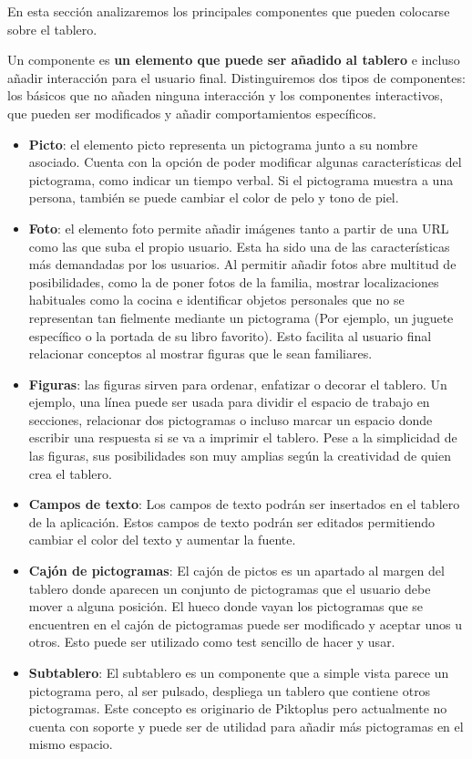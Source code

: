 En esta sección analizaremos los principales componentes que pueden colocarse sobre el tablero. 

Un componente es \textbf{un elemento que puede ser añadido al tablero} e incluso añadir interacción para el usuario final. Distinguiremos dos tipos de componentes: los básicos que no añaden ninguna interacción y los componentes interactivos, que pueden ser modificados y añadir comportamientos específicos.

\begin{itemize}
	
	
	\item \textbf{Picto}: el elemento picto representa un pictograma junto a su nombre asociado. Cuenta con la opción de poder modificar algunas características del pictograma, como indicar un tiempo verbal. Si el pictograma muestra a una persona, también se puede cambiar el color de pelo y tono de piel.
	
	\item \textbf{Foto}: el elemento foto permite añadir imágenes tanto a partir de una URL como las que suba el propio usuario. Esta ha sido una de las características más demandadas por los usuarios. Al permitir añadir fotos abre multitud de posibilidades, como la de poner fotos de la familia, mostrar localizaciones habituales como la cocina e identificar objetos personales que no se representan tan fielmente mediante un pictograma (Por ejemplo, un juguete específico o la portada de su  libro favorito). Esto facilita al usuario final relacionar conceptos al mostrar figuras que le sean familiares.
	
	\item \textbf{Figuras}: las figuras sirven para ordenar, enfatizar o decorar el tablero. Un ejemplo,  una línea puede ser usada para dividir el espacio de trabajo en secciones, relacionar dos pictogramas o incluso marcar un espacio donde escribir una respuesta si se va a imprimir el tablero. Pese a la simplicidad de las figuras, sus posibilidades son muy amplias según  la creatividad de quien crea el tablero.
	
	\item \textbf{Campos de texto}: Los campos de texto podrán ser insertados en el tablero de la aplicación. Estos campos de texto podrán ser editados permitiendo cambiar el color del texto y aumentar la fuente.
	
	\item \textbf{Cajón de pictogramas}: El cajón de pictos es un apartado al margen del tablero donde aparecen un conjunto de pictogramas que el usuario debe mover a alguna posición. El hueco donde vayan los pictogramas que se encuentren en el cajón de pictogramas puede ser modificado y aceptar unos u otros. Esto puede ser utilizado como test sencillo de hacer y usar.
	
	\item \textbf{Subtablero}: El subtablero es un componente que a simple vista parece un pictograma pero, al ser pulsado, despliega un tablero que contiene otros pictogramas. Este concepto es originario de Piktoplus pero actualmente no cuenta con soporte y puede ser de utilidad para añadir más pictogramas en el mismo espacio.
\end{itemize}

